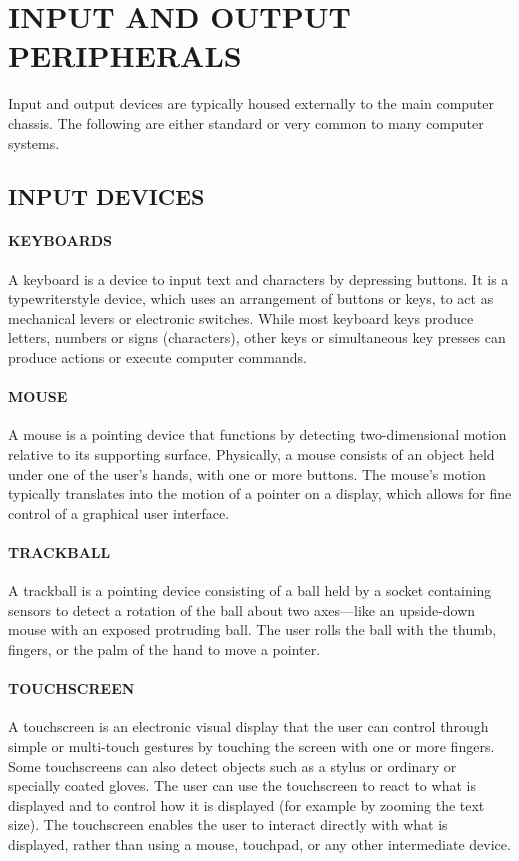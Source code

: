 	\section{INPUT AND OUTPUT PERIPHERALS}
	Input and output devices are typically housed externally to the main computer chassis. The following are either
	standard or very common to many computer systems.
	\subsection{INPUT DEVICES}
	\paragraph{ KEYBOARDS}
		 A keyboard is a device to input text and characters by depressing buttons. It is a typewriterstyle
	device, which uses an arrangement of buttons or keys, to act as mechanical levers or electronic
	switches. While most keyboard keys produce letters, numbers or signs (characters), other keys or
	simultaneous key presses can produce actions or execute computer commands.
	\paragraph{ MOUSE}
	 A mouse is a pointing device that functions by detecting two-dimensional motion relative to its
	supporting surface. Physically, a mouse consists of an object held under one of the user's hands, with
	one or more buttons. The mouse's motion typically translates into the motion of a pointer on a display,
	which allows for fine control of a graphical user interface. 
	\paragraph{TRACKBALL}
	 A trackball is a pointing device consisting of a ball held by a socket containing sensors to
	detect a rotation of the ball about two axes—like an upside-down mouse with an exposed protruding
	ball. The user rolls the ball with the thumb, fingers, or the palm of the hand to move a pointer.
	\paragraph {TOUCHSCREEN}
	 A touchscreen is an electronic visual display that the user can control through simple
	or multi-touch gestures by touching the screen with one or more fingers. Some touchscreens can also
	detect objects such as a stylus or ordinary or specially coated gloves. The user can use the touchscreen
	to react to what is displayed and to control how it is displayed (for example by zooming the text size).
		The touchscreen enables the user to interact directly with what is displayed, rather than using
	a mouse, touchpad, or any other intermediate device. 
